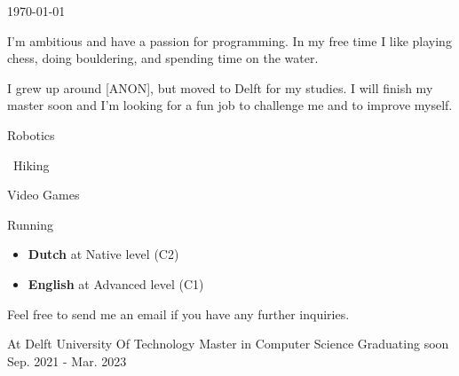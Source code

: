 \documentclass[11pt, a4paper]{awesome-cv}
\begin{document}
\makecvheader

\makecvfooter
  {\today}
  {}
  {}
  
\begin{paracol}{2}
	
	\begin{cvparagraph}
		I'm ambitious and have a passion for programming. In my free time I like playing chess, doing bouldering, and spending time on the water. 
		
		I grew up around [ANON], but moved to Delft for my studies. I will finish my master soon and I'm looking for a fun job to challenge me and to improve myself.
	\end{cvparagraph}

	
	\begin{cvparagraph}
		\begin{description}[leftmargin=*]
			\item[] \faRobot \hspace*{0.1cm} Robotics
			\item[] \faHiking \hspace*{0.15cm} \, Hiking
			\item[] \faGamepad \hspace*{0.1cm} Video Games
			\item[] \faRunning \hspace*{0.20cm} Running
		\end{description}
	\end{cvparagraph}
	
	\cvsection{Languages}
	
	\begin{cvparagraph}
		\begin{itemize}[leftmargin=*]
			\item \textbf{Dutch} at Native level (C2)
			\item \textbf{English} at Advanced level (C1)
		\end{itemize}
	\end{cvparagraph}

	\cvsection{Contact}
	
	\begin{cvparagraph}
		Feel free to send me an email if you have any further inquiries.
	\end{cvparagraph}

	
	\switchcolumn
	
	\begin{cventries}
		\shortcventry
		{At Delft University Of Technology}
		{Master in Computer Science}
		{Graduating soon}
		{Sep. 2021 - Mar. 2023}
		

\end{cventries}
\end{paracol}
\end{document}
